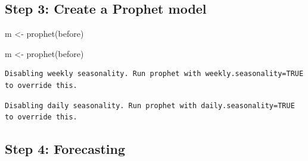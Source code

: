 \documentclass[
  letterpaper,
  DIV=11,
  numbers=noendperiod]{scrartcl}
\newenvironment{Shaded}{\begin{snugshade}}{\end{snugshade}}
\newcommand{\AttributeTok}[1]{\textcolor[rgb]{0.40,0.45,0.13}{#1}}
\newcommand{\FunctionTok}[1]{\textcolor[rgb]{0.28,0.35,0.67}{#1}}
\newcommand{\NormalTok}[1]{\textcolor[rgb]{0.00,0.23,0.31}{#1}}
\newcommand{\OtherTok}[1]{\textcolor[rgb]{0.00,0.23,0.31}{#1}}
\newcommand{\SpecialCharTok}[1]{\textcolor[rgb]{0.37,0.37,0.37}{#1}}
\newcommand{\StringTok}[1]{\textcolor[rgb]{0.13,0.47,0.30}{#1}}
\begin{document}
\hypertarget{step-3-create-a-prophet-model-1}{%
\subsection{Step 3: Create a Prophet
model}\label{step-3-create-a-prophet-model-1}}

\begin{Shaded}
\begin{Highlighting}[]
\NormalTok{m }\OtherTok{\textless{}{-}} \FunctionTok{prophet}\NormalTok{(before)}
\end{Highlighting}
\end{Shaded}

\begin{Shaded}
\begin{Highlighting}[]
\NormalTok{m }\OtherTok{\textless{}{-}} \FunctionTok{prophet}\NormalTok{(before)}
\end{Highlighting}
\end{Shaded}

\begin{verbatim}
Disabling weekly seasonality. Run prophet with weekly.seasonality=TRUE to override this.
\end{verbatim}

\begin{verbatim}
Disabling daily seasonality. Run prophet with daily.seasonality=TRUE to override this.
\end{verbatim}

\hypertarget{step-4-forecasting}{%
\subsection{Step 4: Forecasting}\label{step-4-forecasting}}

\begin{Shaded}
\end{Shaded}

\begin{Shaded}
\end{Shaded}
\end{document}
